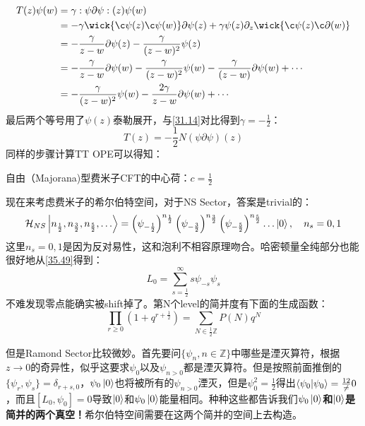 \begin{equation}
	\begin{aligned}
		T(z) \psi(w)&=\gamma:\psi\partial\psi:(z)\psi(w)\\
		&=-\gamma \wick{\c\psi(z)\c\psi(w)}\partial\psi(z)+\gamma\psi(z)\partial_z\wick{\c\psi(z)\c\partial(w)}\\
		&=-\frac{\gamma}{z-w}\partial\psi(z)-\frac{\gamma}{(z-w)^2}\psi(z)\\
		&=-\frac{\gamma}{z-w}\partial\psi(w)-\frac{\gamma}{(z-w)^2}\psi(w)-\frac{\gamma}{(z-w)}\partial\psi(w)+\cdots\\
		&=-\frac{\gamma}{(z-w)^2}\psi(w)-\frac{2\gamma}{z-w}\partial\psi(w)+\cdots
	\end{aligned}
\end{equation}
最后两个等号用了$\psi(z)$泰勒展开，与\ref{31.14}对比得到$\gamma=-\frac1{2}$：
\begin{equation}
	\boxed{
			T(z)=-\frac1{2} N\left(\psi\partial\psi\right)(z)
	}
\end{equation}
同样的步骤计算TT OPE可以得知：
\begin{theorem}
	自由（Majorana)型费米子CFT的中心荷：$\boxed{c=\frac{1}{2}}$
\end{theorem}

现在来考虑费米子的希尔伯特空间，对于NS Sector，答案是trivial的：
\begin{equation}
	\mathcal{H}_{NS}\ket{n_{\frac12},n_{\frac32},n_{\frac52},\ldots}=\left(\psi_{-\frac12}\right)^{n_{\frac12}}\left(\psi_{-\frac32}\right)^{n_{\frac32}}\left(\psi_{-\frac52}\right)^{n_{\frac52}}\ldots\left|0\right\rangle,\quad n_{s}=0,1
\end{equation}
这里$n_s=0,1$是因为反对易性，这和泡利不相容原理吻合。哈密顿量全纯部分也能很好地从\ref{35.49}得到：
\begin{equation}
	L_0=\sum_{s=\frac12}^\infty s\psi_{-s}\psi_s
\end{equation}
不难发现零点能确实被shift掉了。第N个level的简并度有下面的生成函数：
\begin{equation}
	\prod_{r\geq0}\left(1+q^{r+\frac12}\right)=\sum_{N\in\frac12\mathbb{Z}}P(N)q^N
\end{equation}

但是Ramond Sector比较微妙。首先要问$\{\psi_{n},n\in\mathbb{Z}\}$中哪些是湮灭算符，根据$z\to 0$的奇异性，似乎这要求$\psi_0$以及$\psi_{n>0}$都是湮灭算符。但是按照前面推倒的$\{\psi_r,\psi_s\}=\delta_{r+s,0}$，$\psi_0\ket{0}$也将被所有的$\psi_{n>0}$湮灭，但是$\psi_0^2=\frac{1}{2}$得出$\braket{\psi_0}=\frac{12}\neq 0$，而且$[L_0,\psi_0]=0$导致$\ket{0}$和$\psi_0\ket{0}$能量相同。种种这些都告诉我们\textbf{$\psi_0\ket{0}$和$\ket{0}$是简并的两个真空！}希尔伯特空间需要在这两个简并的空间上去构造。

